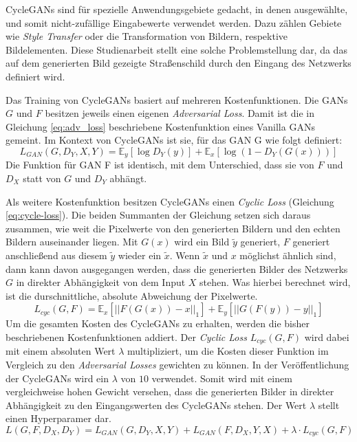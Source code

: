 \acp{CycleGAN} sind für spezielle Anwendungsgebiete gedacht, in denen ausgewählte, und somit nicht-zufällige Eingabewerte verwendet werden. Dazu zählen Gebiete wie \emph{Style Transfer} oder die Transformation von Bildern, respektive Bildelementen. Diese Studienarbeit stellt eine solche Problemstellung dar, da das auf dem generierten Bild gezeigte Straßenschild durch den Eingang des Netzwerks definiert wird.

Das Training von \acp{CycleGAN} basiert auf mehreren Kostenfunktionen. Die \acp{GAN} $G$ und $F$ besitzen jeweils einen eigenen \emph{Adversarial Loss}. Damit ist die in Gleichung \ref{eq:adv_loss} beschriebene Kostenfunktion eines Vanilla \acp{GAN} gemeint. Im Kontext von \acp{CycleGAN} ist sie, für das \ac{GAN} G wie folgt definiert:
\begin{equation}
	L_{GAN}(G, D_Y, X, Y) = \mathbb{E}_y[\log{D_Y(y)}] + \mathbb{E}_x[\log(1-D_Y(G(x)))]
\end{equation}
Die Funktion für \ac{GAN} F ist identisch, mit dem Unterschied, dass sie von $F$ und $D_X$ statt von $G$ und $D_Y$ abhängt.

Als weitere Kostenfunktion besitzen \acp{CycleGAN} einen \emph{Cyclic Loss} (Gleichung \ref{eq:cycle-loss}). Die beiden Summanten der Gleichung setzen sich daraus zusammen, wie weit die Pixelwerte von den generierten Bildern und den echten Bildern auseinander liegen. Mit $G(x)$ wird ein Bild $\tilde{y}$ generiert, $F$ generiert anschließend aus diesem $\tilde{y}$ wieder ein $\tilde{x}$. Wenn $\tilde{x}$ und $x$ möglichst ähnlich sind, dann kann davon ausgegangen werden, dass die generierten Bilder des Netzwerks $G$ in direkter Abhängigkeit von dem Input $X$ stehen. Was hierbei berechnet wird, ist die durschnittliche, absolute Abweichung der Pixelwerte.
\begin{equation}
   \label{eq:cycle-loss}
	L_{cyc}(G, F) = \mathbb{E}_x[||F(G(x))-x||_1] + \mathbb{E}_y[||G(F(y))-y||_1]
\end{equation}
Um die gesamten Kosten des \acp{CycleGAN} zu erhalten, werden die bisher beschriebenen Kostenfunktionen addiert. Der \emph{Cyclic Loss} $L_{cyc}(G, F)$ wird dabei mit einem absoluten Wert $\lambda$ multipliziert, um die Kosten dieser Funktion im Vergleich zu den \emph{Adversarial Losses} gewichten zu können. In der Veröffentlichung der \acp{CycleGAN} wird ein $\lambda$ von $10$ verwendet. Somit wird mit einem vergleichweise hohen Gewicht versehen, dass die generierten Bilder in direkter Abhängigkeit zu den Eingangswerten des \acp{CycleGAN} stehen. Der Wert $\lambda$ stellt einen Hyperparamer dar. \cite{cycleGAN}
\begin{equation}
	L(G, F, D_X, D_Y) = L_{GAN}(G, D_Y, X, Y) + L_{GAN}(F, D_X, Y, X) + \lambda \cdot L_{cyc}(G, F)
\end{equation}
\cite{cycleGAN}

